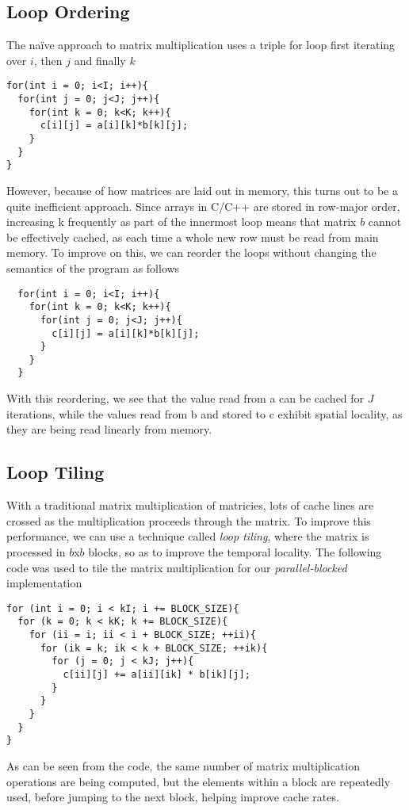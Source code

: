 \documentclass[letterpaper,twocolumn,10pt]{article}
\begin{document}
\subsection{Loop Ordering}
The na\"{i}ve approach to matrix multiplication uses a triple for loop first iterating
over $i$, then $j$ and finally $k$
\begin{verbatim}
for(int i = 0; i<I; i++){
  for(int j = 0; j<J; j++){
    for(int k = 0; k<K; k++){
      c[i][j] = a[i][k]*b[k][j];
    }
  }
}
\end{verbatim}
However, because of how matrices are laid out in memory, this turns out to be a 
quite inefficient approach. Since arrays in C/C++ are stored in row-major order,
increasing k frequently as part of the innermost loop means that matrix $b$ cannot
be effectively cached, as each time a whole new row must be read from main memory.
To improve on this, we can reorder the loops without changing the semantics of the
program as follows
\begin{verbatim}
  for(int i = 0; i<I; i++){
    for(int k = 0; k<K; k++){
      for(int j = 0; j<J; j++){
        c[i][j] = a[i][k]*b[k][j];
      }
    }
  }
  \end{verbatim}
With this reordering, we see that the value read from a can be cached for $J$ 
iterations, while the values read from b and stored to c exhibit spatial
locality, as they are being read linearly from memory.
\subsection{Loop Tiling}
With a traditional matrix multiplication of matricies, lots of cache lines are
crossed as the multiplication proceeds through the matrix. To improve this
performance, we can use a technique called \textit{loop tiling}, where the
matrix is processed in $b$x$b$ blocks, so as to improve the temporal locality.
The following code was used to tile the matrix multiplication for our
\textit{parallel-blocked} implementation
\begin{verbatim}
for (int i = 0; i < kI; i += BLOCK_SIZE){
  for (k = 0; k < kK; k += BLOCK_SIZE){
    for (ii = i; ii < i + BLOCK_SIZE; ++ii){
      for (ik = k; ik < k + BLOCK_SIZE; ++ik){
        for (j = 0; j < kJ; j++){
          c[ii][j] += a[ii][ik] * b[ik][j];
        }
      }
    }
  }
}
\end{verbatim}
As can be seen from the code, the same number of matrix multiplication operations
are being computed, but the elements within a block are repeatedly used, before
jumping to the next block, helping improve cache rates.
\end{document}
